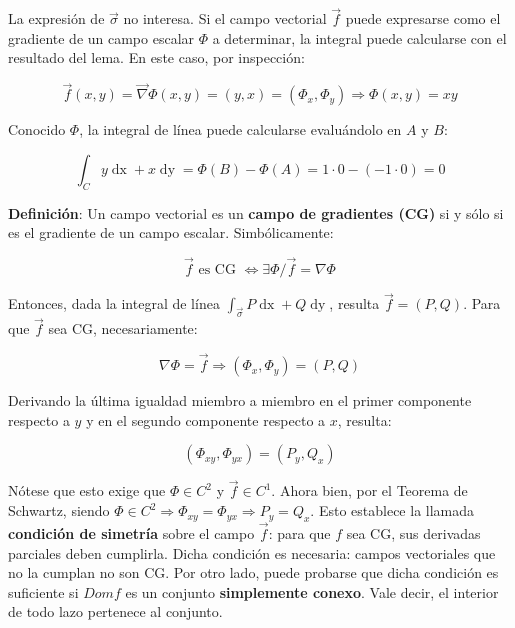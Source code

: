 \documentclass{article}
\begin{document}
La expresión de $\overrightarrow{\sigma}$ no interesa. Si el campo vectorial $\overrightarrow{f}$ puede expresarse como el gradiente de un campo escalar $\Phi$ a determinar, la integral puede calcularse con el resultado del lema. En este caso, por inspección:

\begin{equation}
\overrightarrow{f}(x, y) = \overrightarrow{\nabla}\Phi(x, y) = (y, x) = (\Phi_x, \Phi_y) \Rightarrow \Phi(x, y) = xy
\end{equation}

Conocido $\Phi$, la integral de línea puede calcularse evaluándolo en $A$ y $B$:

\begin{equation}
\int_C y \mathop{dx} + x \mathop{dy} = \Phi(B) - \Phi(A) = 1 \cdot 0 - (-1 \cdot 0) = 0
\end{equation}

\textbf{Definición}: Un campo vectorial es un \textbf{campo de gradientes (CG)} si y sólo si es el gradiente de un campo escalar. Simbólicamente:

\begin{equation}
\overrightarrow{f} \text{ es CG } \Leftrightarrow \exists \Phi / \overrightarrow{f} = \nabla \Phi
\end{equation}

Entonces, dada la integral de línea $\int_{\overrightarrow{\sigma}} P \mathop{dx} + Q \mathop{dy}$, resulta $\overrightarrow{f} = (P, Q)$. Para que $\overrightarrow{f}$ sea CG, necesariamente:

\begin{equation}
\nabla\Phi = \overrightarrow{f} \Rightarrow (\Phi_x, \Phi_y) = (P, Q)
\end{equation}

Derivando la última igualdad miembro a miembro en el primer componente respecto a $y$ y en el segundo componente respecto a $x$, resulta:

\begin{equation}
(\Phi_{xy}, \Phi_{yx}) = (P_y, Q_x)
\end{equation}

Nótese que esto exige que $\Phi \in C^2$ y $\overrightarrow{f} \in C^1$. Ahora bien, por el Teorema de Schwartz, siendo $\Phi \in C^2 \Rightarrow \Phi_{xy} = \Phi_{yx} \Rightarrow P_y = Q_x$. Esto establece la llamada \textbf{condición de simetría} sobre el campo $\overrightarrow{f}$: para que $f$ sea CG, sus derivadas parciales deben cumplirla. Dicha condición es necesaria: campos vectoriales que no la cumplan no son CG. Por otro lado, puede probarse que dicha condición es suficiente si $Dom f$ es un conjunto \textbf{simplemente conexo}. Vale decir, el interior de todo lazo pertenece al conjunto.
\end{document}

